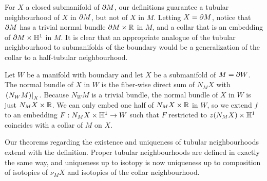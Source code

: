 
For $X$ a closed submanifold of $\partial M$, our definitions guarantee a tubular neighbourhood of $X$ in $\partial M$, but not of $X$ in $M$.
Letting $X=\partial M$, notice that $\partial M$ has a trivial normal bundle $\partial M\times \mathbb{R}$ in $M$, and a collar that is an embedding of $\partial M\times\mathbb{H}^1$ in $M$.
It is clear that an appropriate analogue of the tubular neighbourhood to submanifolds of the boundary would be a generalization of the collar to a half-tubular neighbourhood.

\begin{defn}
	\label{def:halfneighbourhood}
	Let $W$ be a manifold with boundary and let $X$ be a submanifold of $M=\partial W$.
	The normal bundle of $X$ in $W$ is the fiber-wise direct sum of $N_M X$ with $\left.(N_W M)\right|_{X}$.
	Because $N_W M$ is a trivial bundle, the normal bundle of $X$ in $W$ is just $N_M X\times \mathbb{R}$.
	We can only embed one half of $N_M X\times \mathbb{R}$ in $W$, so we extend $f$ to an embedding $F:N_M X\times \mathbb{H}^1\to W$ such that $F$ restricted to $z(N_M X)\times\mathbb{H}^1$ coincides with a collar of $M$ on $X$.
\end{defn}

Our theorems regarding the existence and uniqueness of tubular neighbourhoods extend with the definition.
Proper tubular neighbourhoods are defined in exactly the same way, and uniqueness up to isotopy is now uniqueness up to composition of isotopies of $\nu_M X$ and isotopies of the collar neighbourhood.